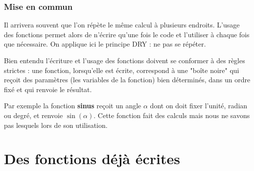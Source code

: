 \subsubsection{Mise en commun}
Il arrivera souvent que l'on répète le même calcul à plusieurs endroits. L'usage des fonctions permet alors de n'écrire qu'une fois le code et l'utiliser à chaque fois que nécessaire. On applique ici le principe DRY
 : ne pas se répéter.

\medskip

Bien entendu l'écriture et l'usage des fonctions doivent se conformer à des règles strictes : une fonction, lorsqu'elle est écrite, correspond à une "boîte noire" qui reçoit des paramètres (les variables de la fonction) bien déterminés, dans un ordre fixé et qui renvoie le résultat.

Par exemple la fonction {\bf sinus} reçoit  un angle $\alpha$ dont on doit fixer l'unité, radian ou degré, et renvoie $\sin(\alpha)$.
Cette fonction fait des calculs mais nous ne savons pas lesquels lors de son utilisation.
\newpage
\section{Des fonctions déjà écrites}
